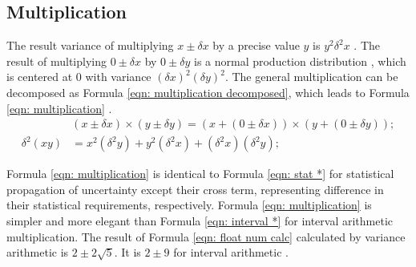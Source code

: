 \documentclass[twoside]{article}
\numberwithin{equation}{section}
\newcommand{\eqspace}{\;\;\;}
\begin{document}
\subsection{Multiplication}

The result variance of multiplying $x \pm \delta x$ by a precise value $y$ is $ y^2 \delta^2 x$ \cite{Probability_Statistics}.
The result of multiplying $0 \pm \delta x$ by $0 \pm \delta y$ is a normal production distribution \cite{Probability_Statistics}, which is centered at 0 with variance $(\delta x)^2 (\delta y)^2$.
The general multiplication can be decomposed as Formula \eqref{eqn: multiplication decomposed}, which leads to Formula \eqref{eqn: multiplication}  \cite{Prev_Precision_Arithmetic}.
\begin{align}
\label{eqn: multiplication decomposed}
& (x \pm \delta x) \times (y \pm \delta y) = (x + (0 \pm \delta x)) \times (y + (0 \pm \delta y)); \\
\label{eqn: multiplication}
\delta^2 (x y) &= x^2 (\delta^2 y) + y^2 (\delta^2 x) + (\delta^2 x)(\delta^2 y);
\end{align}

Formula \eqref{eqn: multiplication} is identical to Formula \eqref{eqn: stat *} for statistical propagation of uncertainty except their cross term, representing difference in their statistical requirements, respectively.  
Formula \eqref{eqn: multiplication} is simpler and more elegant than Formula \eqref{eqn: interval *} for interval arithmetic multiplication.  
The result of Formula \eqref{eqn: float num calc} calculated by variance arithmetic is $2 \pm 2\sqrt{5}$.
It is $2 \pm 9$ for interval arithmetic \cite{Worst_Case_Error_Bounds}.
\end{document}

